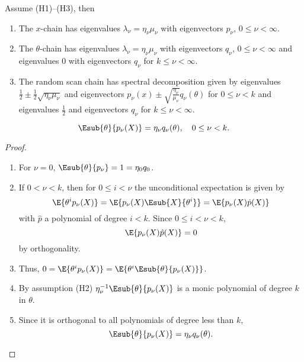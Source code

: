 \documentclass[12pt]{article}
\begin{document}
\begin{theorem}
    Assume (H1)--(H3), then
    \begin{enumerate}
        \item
            \label{it:spectralbounds:thmparta} The \( x \)-chain has
            eigenvalues \( \lambda_{\nu} = \eta_{\nu} \mu_{\nu} \) with
            eigenvectors \( p_{\nu} \), \( 0 \le \nu < \infty \).
        \item
            \label{it:spectralbounds:thmpartb} The \( \theta \)-chain
            has eigenvalues \( \lambda_{\nu} = \eta_{\nu} \mu_{\nu} \)
            with eigenvectors \( q_{\nu} \), \( 0 \le \nu < \infty \)
            and eigenvalues \( 0 \) with eigenvectors \( q_{\nu} \) for \(
            k \le \nu < \infty \).
        \item
            \label{it:spectralbounds:thmpartc} The random scan chain has
            spectral decomposition given by eigenvalues \( \frac{1}{2}
            \pm \frac{1}{2} \sqrt{\eta_{\nu} \mu_{\nu}} \) and
            eigenvectors \( p_{\nu} (x) \pm \sqrt{\frac{\eta_{\nu}}{\mu_
            {\nu}}} q_{\nu}(\theta) \) for \( 0 \le \nu < k \) and
            eigenvalues \( \frac{1}{2} \) and eigenvectors \( q_{\nu} \)
            for \( k \le \nu < \infty \).
    \end{enumerate}
\end{theorem}

\begin{lemma}
    \label{lem:spectralbounds:lemma1} %
    \[
        \Esub{\theta}{p_{\nu}(X)} = \eta_{\nu} q_{\nu}(\theta), \quad 0
        \le \nu < k.
    \]
\end{lemma}

\begin{proof}
    \begin{enumerate}
        \item
            For \( \nu = 0 \), \( \Esub{\theta}{p_{\nu}} = 1 = \eta_0 q_0
            \).
        \item
            If \( 0 < \nu < k \), then for \( 0 \le i < \nu \) the
            unconditional expectation is given by
            \[
                \E{\theta^i p_{\nu}(X)} = \E{ p_{\nu}(X) \Esub{X}{\theta^i}}
                = \E{p_{\nu}(X) \hat{p}(X)}
            \] with \( \hat{p} \) a polynomial of degree \( i < k \).
            Since \( 0 \le i < \nu < k \),
            \[
                \E{p_{\nu}(X) \hat{p}(X)} = 0
            \] by orthogonality.
        \item
            Thus, \( 0 = \E{\theta^i p_{\nu}(X)} = \E{\theta^i \Esub{\theta}
            {p_{\nu}(X)}} \).
        \item
            By assumption (H2) \( \eta_{\nu}^{-1} \Esub{\theta}{p_{\nu}(X)}
            \) is a monic polynomial of degree \( k \) in \( \theta \).
        \item
            Since it is orthogonal to all polynomials of degree less
            than \( k \),
            \[
                \Esub{\theta}{p_{\nu}(X)} = \eta_{\nu} q_{\nu} (\theta).
            \]
    \end{enumerate}
\end{proof}
\end{document}
